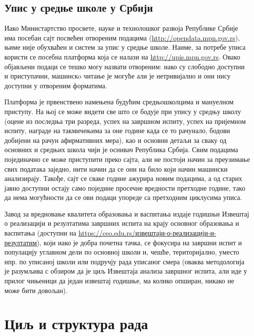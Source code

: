 \subsection{Упис у средње школе у Србији}

Иако Министартство просвете, науке и технолошког развоја Републике Србије има посебан сајт посвећен отвореним подацима (\url{http://opendata.mpn.gov.rs}), њиме није обухваћен и систем за упис у средње школе. Наиме, за потребе уписа користи се посебна платформа која се налази на \url{http://upis.mpn.gov.rs}. Овако објављени подаци се тешко могу назвати отвореним: иако су слободно доступни и приступачни, машинскo читање је могуће али је нетривијално и они нису доступни у отвореним форматима. 

Платформа је првенствено намењена будућим средњошколцима и мануелном приступу. На њој се може видети све што се бодује при упису у средњу школу (оцене из последња три разреда, успех на завршном испиту, успех на пријемном испиту, награде на такмичењима за оне године када се то рачунало, бодови добијени на рачун афирмативних мера), као и основни детаљи за сваку од основних и средњих школа чији је оснивач Република Србија. Свим подацима појединачно се може приступити преко сајта, али не постоји начин за преузимање свих података заједно, нити начин да се они на било који начин машински анализирају. Такође, сајт се сваке године ажурира новим подацима, а од старих јавно доступни остају само поједине просечне вредности претходне године, тако да нема могућности да се ови подаци упореде са претходним циклусима уписа.

Завод за вредновање квалитета образовања и васпитања издаје годишњи Извештај о реализацији и резултатима завршних испита на крају основног образовања и васпитања (доступни на \href{https://ceo.edu.rs/\%D0\%B8\%D0\%B7\%D0\%B2\%D0\%B5\%D1\%88\%D1\%82\%D0\%B0\%D1\%98\%D0\%B8-\%D0\%BE-\%D1\%80\%D0\%B5\%D0\%B0\%D0\%BB\%D0\%B8\%D0\%B7\%D0\%B0\%D1\%86\%D0\%B8\%D1\%98\%D0\%B8-\%D0\%B8-\%D1\%80\%D0\%B5\%D0\%B7\%D1\%83\%D0\%BB\%D1\%82\%D0\%B0\%D1\%82\%D0\%B8\%D0\%BC/}{https://ceo.edu.rs/извештаји-о-реализацији-и-резултатим}), који иако је добра почетна тачка, се фокусира на завршни испит и популацију углавном дели по основној школи и, чешће, територијално, уместо нпр. по уписаној школи или подручју рада уписаног смера (оваква методологија је разумљива с обзиром да је циљ Извештаја анализа завршног испита, али иде у прилог чињеници да један извештај годишње, ма колико опширан, никако не може бити довољан).

\section{Циљ и структура рада}

